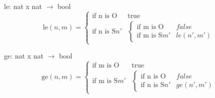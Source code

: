 \documentclass[11pt]{article}
\begin{document}
le: nat x nat $\rightarrow$ bool\\
\[\text{le}(n, m) =
  \begin{cases}
    \text{if n is O} & \text{true}\\
    \text{if n is S}n' & \begin{cases}
                          \text{if m is O} & false\\
                          \text{if m is S}m' & le(n',m')
                        \end{cases}
  \end{cases}
\]

ge: nat x nat $\rightarrow$ bool\\
\[\text{ge}(n, m) =
  \begin{cases}
    \text{if m is O} & \text{true}\\
    \text{if m is S}m' & \begin{cases}
                          \text{if n is O} & false\\
                          \text{if n is S}n' & ge(n',m')
                        \end{cases}
  \end{cases}
\]
\end{document}
